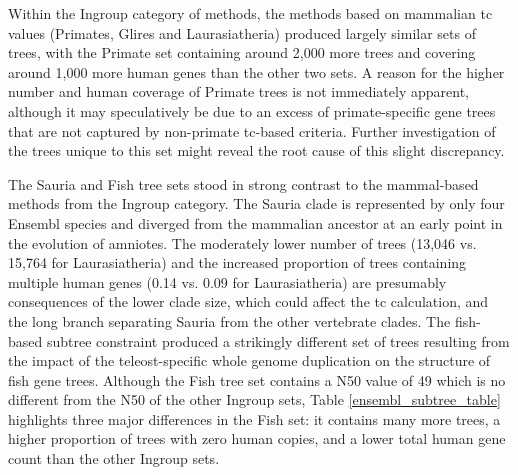 Within the Ingroup category of methods, the methods based on
mammalian \ac{tc} values (Primates, Glires and Laurasiatheria) produced
largely similar sets of trees, with the Primate set containing around
2,000 more trees and covering around 1,000 more human genes than the
other two sets. A reason for the higher number and human coverage of
Primate trees is not immediately apparent, although it may
speculatively be due to an excess of primate-specific gene trees that
are not captured by non-primate \ac{tc}-based criteria. Further
investigation of the trees unique to this set might reveal the root
cause of this slight discrepancy.

The Sauria and Fish tree sets stood in strong contrast to the
mammal-based methods from the Ingroup category. The Sauria clade is
represented by only four Ensembl species and diverged from the
mammalian ancestor at an early point in the evolution of amniotes. The
moderately lower number of trees (13,046 vs. 15,764 for
Laurasiatheria) and the increased proportion of trees containing
multiple human genes (0.14 vs. 0.09 for Laurasiatheria) are presumably
consequences of the lower clade size, which could affect the \ac{tc}
calculation, and the long branch separating Sauria from the other
vertebrate clades. The fish-based subtree constraint produced a
strikingly different set of trees resulting from the impact of the
teleost-specific whole genome duplication on the structure of fish
gene trees. Although the Fish tree set contains a N50 value of 49
which is no different from the N50 of the other Ingroup sets, Table
\ref{ensembl_subtree_table} highlights three major differences in the
Fish set: it contains many more trees, a higher proportion of trees
with zero human copies, and a lower total human gene count than the
other Ingroup sets.

